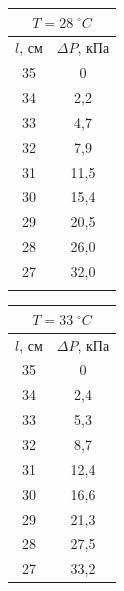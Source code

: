 \documentclass[a4paper]{article}
\begin{document}
	\begin{figure}[htb]		
		\begin{minipage}[b]{0.3\textwidth}
			
					\begin{tabular}{c|c}
					\multicolumn{2}{c}{$T=28\;^{\circ} C$}\\
					\hline
					$l$, см&$\Delta P$, кПа  \\
					\hline
					35&  0\\
					
					34& 2,2 \\
					
					33&  4,7\\
					
					32&  7,9\\
					
					31&11,5  \\
					
					30& 15,4 \\
					
					29&  20,5\\
					
					28&  26,0\\
					
					27&32,0\\
					\multicolumn{2}{c}{}
				\end{tabular}
		\end{minipage}
	\hfil
	\begin{minipage}[b]{0.3\textwidth}
		\begin{tabular}{c|c}
			\multicolumn{2}{c}{$T=33\;^{\circ} C$}\\
			\hline
			$l$, см&$\Delta P$, кПа  \\
			\hline
			35&  0\\
			
			34& 2,4 \\
			
			33&  5,3\\
			
			32&  8,7\\
			
			31&12,4  \\
			
			30& 16,6 \\
			
			29& 21,3\\
			
			28&  27,5\\
			
			27&33,2\\
			

\end{tabular}
\end{minipage}
\end{figure}
\end{document}

